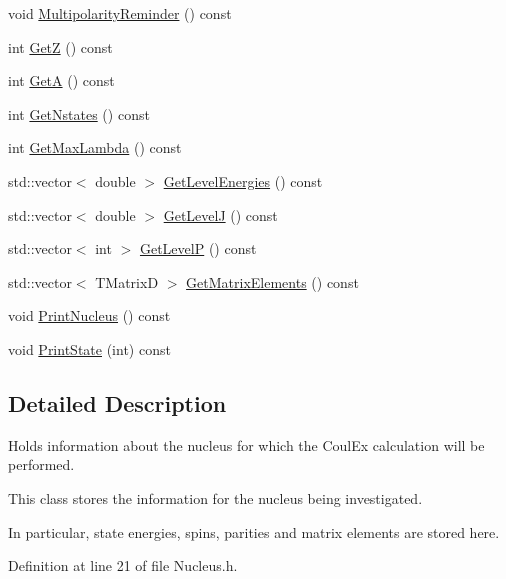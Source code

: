 \begin{DoxyCompactItemize}
\item 
void \hyperlink{classNucleus_acae853f19a3a2e9c089f434913c6855a}{Multipolarity\-Reminder} () const 
\item 
int \hyperlink{classNucleus_a6fe587b2187666c9a30af4a3ead73044}{Get\-Z} () const 
\item 
int \hyperlink{classNucleus_a91c1cfdcc70b3c881401cbdc719a1c90}{Get\-A} () const 
\item 
int \hyperlink{classNucleus_acca7f2ea95c6c5df97bff8c32a9d4f7b}{Get\-Nstates} () const 
\item 
int \hyperlink{classNucleus_a189fea3c915a2311acb4aa8539d75e7b}{Get\-Max\-Lambda} () const 
\item 
std\-::vector$<$ double $>$ \hyperlink{classNucleus_acd87e98f8bae53e1071388f2e3be2189}{Get\-Level\-Energies} () const 
\item 
std\-::vector$<$ double $>$ \hyperlink{classNucleus_a8d708b6c13686a9dbb381db367e2534d}{Get\-Level\-J} () const 
\item 
std\-::vector$<$ int $>$ \hyperlink{classNucleus_a7ddb3794e8524fd202b9cdeecb6f49c4}{Get\-Level\-P} () const 
\item 
std\-::vector$<$ T\-Matrix\-D $>$ \hyperlink{classNucleus_a59031576c72363d132171b94bb6dbf35}{Get\-Matrix\-Elements} () const 
\item 
void \hyperlink{classNucleus_a9f56da19abf5b3a42998a44cab1f5c9f}{Print\-Nucleus} () const 
\item 
void \hyperlink{classNucleus_a4d923782b47e0b7e5dbac58c1b12394b}{Print\-State} (int) const 
\end{DoxyCompactItemize}


\subsection{Detailed Description}
Holds information about the nucleus for which the Coul\-Ex calculation will be performed. 

This class stores the information for the nucleus being investigated.

In particular, state energies, spins, parities and matrix elements are stored here. 

Definition at line 21 of file Nucleus.\-h.



